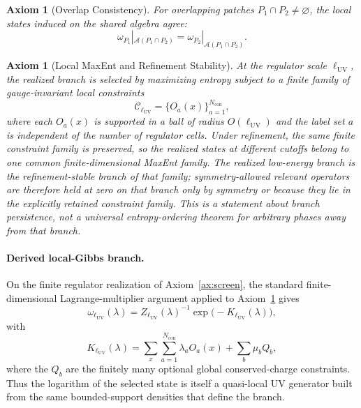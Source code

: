 \documentclass[11pt]{article}
\newtheorem{axiom}[theorem]{Axiom}
\begin{document}
\begin{axiom}[Overlap Consistency]\label{ax:overlap}
For overlapping patches \(P_1\cap P_2\neq\varnothing\), the local states induced on the shared algebra agree:
\[
\omega_{P_1}|_{\mathcal A(P_1\cap P_2)}
=
\omega_{P_2}|_{\mathcal A(P_1\cap P_2)}.
\]
\end{axiom}

\begin{axiom}[Local MaxEnt and Refinement Stability]\label{ax:maxent}
At the regulator scale \(\ell_{\mathrm{UV}}\), the realized branch is selected by maximizing entropy subject to a finite family of gauge-invariant local constraints
\[
\mathcal C_{\ell_{\mathrm{UV}}}=\{O_a(x)\}_{a=1}^{N_{\mathrm{con}}},
\]
where each \(O_a(x)\) is supported in a ball of radius \(O(\ell_{\mathrm{UV}})\) and the label set \(a\) is independent of the number of regulator cells. Under refinement, the same finite constraint family is preserved, so the realized states at different cutoffs belong to one common finite-dimensional MaxEnt family. The realized low-energy branch is the refinement-stable branch of that family; symmetry-allowed relevant operators are therefore held at zero on that branch only by symmetry or because they lie in the explicitly retained constraint family. This is a statement about branch persistence, not a universal entropy-ordering theorem for arbitrary phases away from that branch.
\end{axiom}

\paragraph{Derived local-Gibbs branch.}
On the finite regulator realization of Axiom~\ref{ax:screen}, the standard finite-dimensional Lagrange-multiplier argument applied to Axiom~\ref{ax:maxent} gives
\[
\omega_{\ell_{\mathrm{UV}}}(\lambda)
=
Z_{\ell_{\mathrm{UV}}}(\lambda)^{-1}\exp\!\bigl(-K_{\ell_{\mathrm{UV}}}(\lambda)\bigr),
\]
with
\[
K_{\ell_{\mathrm{UV}}}(\lambda)
=
\sum_x \sum_{a=1}^{N_{\mathrm{con}}}\lambda_a O_a(x)
+\sum_b \mu_b Q_b,
\]
where the \(Q_b\) are the finitely many optional global conserved-charge constraints. Thus the logarithm of the selected state is itself a quasi-local UV generator built from the same bounded-support densities that define the branch.
\end{document}
